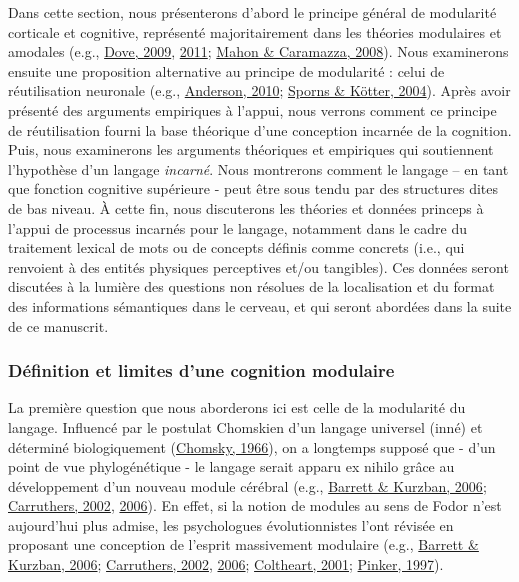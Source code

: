 \documentclass[
  a4paper,12pt,twoside,onecolumn,openright,final,oldfontcommands]{memoir}
\begin{document}
Dans cette section, nous présenterons d'abord le principe général de modularité corticale et cognitive, représenté majoritairement dans les théories modulaires et amodales (e.g., \protect\hyperlink{ref-dove_beyond_2009}{Dove, 2009}, \protect\hyperlink{ref-dove_need_2011}{2011}; \protect\hyperlink{ref-mahon_critical_2008}{Mahon \& Caramazza, 2008}). Nous examinerons ensuite une proposition alternative au principe de modularité : celui de réutilisation neuronale (e.g., \protect\hyperlink{ref-anderson_neural_2010}{Anderson, 2010}; \protect\hyperlink{ref-sporns_motifs_2004}{Sporns \& Kötter, 2004}). Après avoir présenté des arguments empiriques à l'appui, nous verrons comment ce principe de réutilisation fourni la base théorique d'une conception incarnée de la cognition. Puis, nous examinerons les arguments théoriques et empiriques qui soutiennent l'hypothèse d'un langage \emph{incarné}. Nous montrerons comment le langage -- en tant que fonction cognitive supérieure - peut être sous tendu par des structures dites de bas niveau. À cette fin, nous discuterons les théories et données princeps à l'appui de processus incarnés pour le langage, notamment dans le cadre du traitement lexical de mots ou de concepts définis comme concrets (i.e., qui renvoient à des entités physiques perceptives et/ou tangibles). Ces données seront discutées à la lumière des questions non résolues de la localisation et du format des informations sémantiques dans le cerveau, et qui seront abordées dans la suite de ce manuscrit.

\hypertarget{duxe9finition-et-limites-dune-cognition-modulaire}{%
\subsubsection{Définition et limites d'une cognition modulaire}\label{duxe9finition-et-limites-dune-cognition-modulaire}}

La première question que nous aborderons ici est celle de la modularité du langage. Influencé par le postulat Chomskien d'un langage universel (inné) et déterminé biologiquement (\protect\hyperlink{ref-chomsky_cartesian_1966}{Chomsky, 1966}), on a longtemps supposé que - d'un point de vue phylogénétique - le langage serait apparu ex nihilo grâce au développement d'un nouveau module cérébral (e.g., \protect\hyperlink{ref-barrett_modularity_2006}{Barrett \& Kurzban, 2006}; \protect\hyperlink{ref-carruthers_cognitive_2002}{Carruthers, 2002}, \protect\hyperlink{ref-carruthers_architecture_2006}{2006}). En effet, si la notion de modules au sens de Fodor n'est aujourd'hui plus admise, les psychologues évolutionnistes l'ont révisée en proposant une conception de l'esprit massivement modulaire (e.g., \protect\hyperlink{ref-barrett_modularity_2006}{Barrett \& Kurzban, 2006}; \protect\hyperlink{ref-carruthers_cognitive_2002}{Carruthers, 2002}, \protect\hyperlink{ref-carruthers_architecture_2006}{2006}; \protect\hyperlink{ref-coltheart_assumptions_2001}{Coltheart, 2001}; \protect\hyperlink{ref-pinker_how_1997}{Pinker, 1997}).
\end{document}
